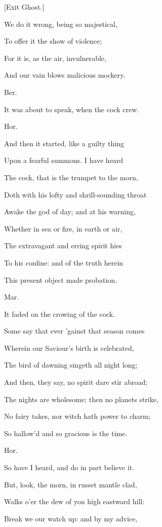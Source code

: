 \documentclass[12pt]{book}
\begin{document}
[Exit Ghost.]



We do it wrong, being so majestical,

To offer it the show of violence;

For it is, as the air, invulnerable,

And our vain blows malicious mockery.



Ber.

It was about to speak, when the cock crew.



Hor.

And then it started, like a guilty thing

Upon a fearful summons. I have heard

The cock, that is the trumpet to the morn,

Doth with his lofty and shrill-sounding throat

Awake the god of day; and at his warning,

Whether in sea or fire, in earth or air,

The extravagant and erring spirit hies

To his confine: and of the truth herein

This present object made probation.



Mar.

It faded on the crowing of the cock.

Some say that ever 'gainst that season comes

Wherein our Saviour's birth is celebrated,

The bird of dawning singeth all night long;

And then, they say, no spirit dare stir abroad;

The nights are wholesome; then no planets strike,

No fairy takes, nor witch hath power to charm;

So hallow'd and so gracious is the time.



Hor.

So have I heard, and do in part believe it.

But, look, the morn, in russet mantle clad,

Walks o'er the dew of yon high eastward hill:

Break we our watch up: and by my advice,
\end{document}
